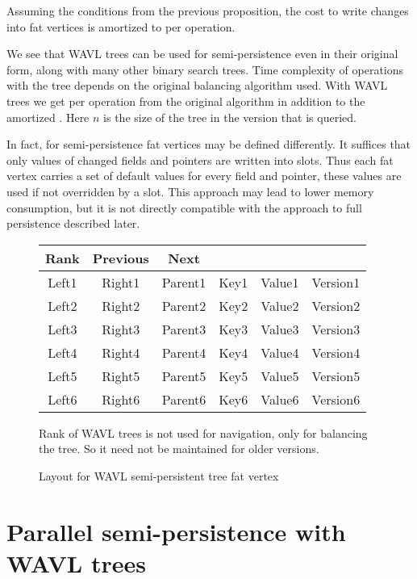\begin{obs}
Assuming the conditions from the previous proposition, the cost to write changes into fat vertices is amortized to  per operation.
\end{obs}

We see that WAVL trees can be used for semi-persistence even in their original form, along with many other binary search trees. Time complexity of operations with the tree depends on the original balancing algorithm used. With WAVL trees we get  per operation from the original algorithm in addition to the amortized . Here $n$ is the size of the tree in the version that is queried.

In fact, for semi-persistence fat vertices may be defined differently. It suffices that only values of changed fields and pointers are written into slots. 
Thus each fat vertex carries a set of default values for every field and pointer, these values are used if not overridden by a slot. 
This approach may lead to lower memory consumption, but it is not directly compatible with the approach to full persistence described later.

\begin{figure}
\begin{center}
	\ttfamily
	\begin{tabular}{cccccc}
		Rank  & Previous &  Next   &      & &          \\ \hline
		Left1 &  Right1  & Parent1 & Key1 & Value1 &  Version1 \\ \hline
		Left2 &  Right2  & Parent2 & Key2 & Value2 & Version2 \\ \hline
		Left3 &  Right3  & Parent3 & Key3 & Value3 & Version3 \\ \hline
		Left4 &  Right4  & Parent4 & Key4 & Value4 & Version4 \\ \hline
		Left5 &  Right5  & Parent5 & Key5 & Value5 & Version5 \\ \hline
		Left6 &  Right6  & Parent6 & Key6 & Value6 & Version6 \\ \hline
	\end{tabular}
\end{center}
Rank of WAVL trees is not used for navigation, only for balancing the tree. So it need not be maintained for older versions.
\caption{Layout for WAVL semi-persistent tree fat vertex}
\end{figure}

\section{Parallel semi-persistence with WAVL trees}

